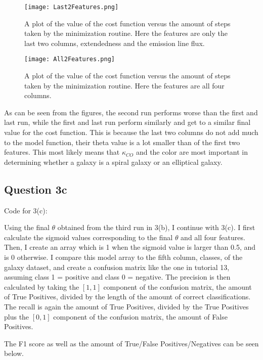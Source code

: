 \begin{figure}[ht!]
  \centering
  \texttt{[image: Last2Features.png]}
  \caption{A plot of the value of the cost function versus the amount of steps taken by the minimization routine. Here the features are only the last two columns, extendedness and the emission line flux.}
  \label{fig:Last2}
\end{figure}

\begin{figure}[ht!]
  \centering
  \texttt{[image: All2Features.png]}
  \caption{A plot of the value of the cost function versus the amount of steps taken by the minimization routine. Here the features are all four columns.}
  \label{fig:All}
\end{figure}

As can be seen from the figures, the second run performs worse than the first and last run, while the first and last run perform similarly and get to a similar final value for the cost function.
This is because the last two columns do not add much to the model function, their theta value is a lot smaller than of the first two features.
This most likely means that $\kappa_{CO}$ and the color are most important in determining whether a galaxy is a spiral galaxy or an elliptical galaxy.

\subsection{Question 3c}

Code for 3(c):


Using the final \textbf{$\theta$} obtained from the third run in 3(b), I continue with 3(c).
I first calculate the sigmoid values corresponding to the final \textbf{$\theta$} and all four features. 
Then, I create an array which is 1 when the sigmoid value is larger than 0.5, and is 0 otherwise.
I compare this model array to the fifth column, classes, of the galaxy dataset, and create a confusion matrix like the one in tutorial 13, assuming class 1 = positive and class 0 = negative.
The precision is then calculated by taking the $[1,1]$ component of the confusion matrix, the amount of True Positives, divided by the length of the amount of correct classifications.
The recall is again the amount of True Positives, divided by the True Positives plus the $[0,1]$ component of the confusion matrix, the amount of False Positives.

The F1 score as well as the amount of True/False Positives/Negatives can be seen below.

